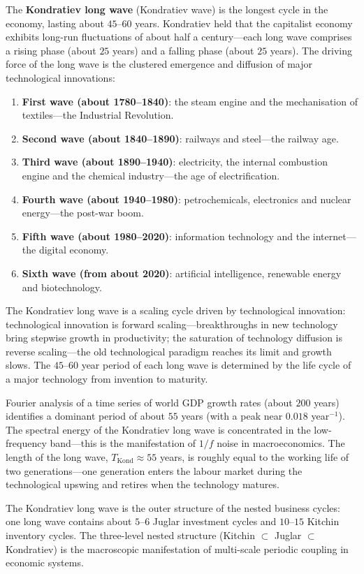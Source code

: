 \begin{definition}\label{def:kondratiev_wave}
The \textbf{Kondratiev long wave} (Kondratiev wave) is the longest cycle in the economy, lasting about $45$--$60$ years. Kondratiev held that the capitalist economy exhibits long-run fluctuations of about half a century---each long wave comprises a rising phase (about $25$ years) and a falling phase (about $25$ years). The driving force of the long wave is the clustered emergence and diffusion of major technological innovations:
\begin{enumerate}[label=(\roman*)]
    \item \textbf{First wave (about 1780--1840)}: the steam engine and the mechanisation of textiles---the Industrial Revolution.
    \item \textbf{Second wave (about 1840--1890)}: railways and steel---the railway age.
    \item \textbf{Third wave (about 1890--1940)}: electricity, the internal combustion engine and the chemical industry---the age of electrification.
    \item \textbf{Fourth wave (about 1940--1980)}: petrochemicals, electronics and nuclear energy---the post-war boom.
    \item \textbf{Fifth wave (about 1980--2020)}: information technology and the internet---the digital economy.
    \item \textbf{Sixth wave (from about 2020)}: artificial intelligence, renewable energy and biotechnology.
\end{enumerate}
The Kondratiev long wave is a scaling cycle driven by technological innovation: technological innovation is forward scaling---breakthroughs in new technology bring stepwise growth in productivity; the saturation of technology diffusion is reverse scaling---the old technological paradigm reaches its limit and growth slows. The $45$--$60$ year period of each long wave is determined by the life cycle of a major technology from invention to maturity.
\end{definition}

\begin{proposition}\label{prop:kondratiev_fourier}
Fourier analysis of a time series of world GDP growth rates (about $200$ years) identifies a dominant period of about $55$ years (with a peak near $0.018$ year$^{-1}$). The spectral energy of the Kondratiev long wave is concentrated in the low-frequency band---this is the manifestation of $1/f$ noise in macroeconomics. The length of the long wave, $T_{\mathrm{Kond}} \approx 55$ years, is roughly equal to the working life of two generations---one generation enters the labour market during the technological upswing and retires when the technology matures.

The Kondratiev long wave is the outer structure of the nested business cycles: one long wave contains about $5$--$6$ Juglar investment cycles and $10$--$15$ Kitchin inventory cycles. The three-level nested structure (Kitchin $\subset$ Juglar $\subset$ Kondratiev) is the macroscopic manifestation of multi-scale periodic coupling in economic systems.
\end{proposition}

